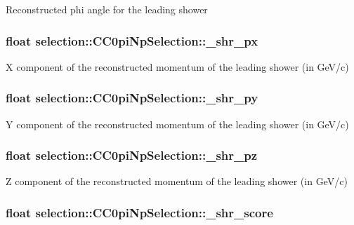 Reconstructed phi angle for the leading shower \hypertarget{classselection_1_1CC0piNpSelection_a52e2043c82f5de7f93ac9bad63563f18}{
\subsubsection[{\-\_\-shr\-\_\-px}]{\setlength{\rightskip}{0pt plus 5cm}float selection\-::\-C\-C0pi\-Np\-Selection\-::\-\_\-shr\-\_\-px\hspace{0.3cm}{\ttfamily [private]}}}\label{classselection_1_1CC0piNpSelection_a52e2043c82f5de7f93ac9bad63563f18}
X component of the reconstructed momentum of the leading shower (in Ge\-V/c) \hypertarget{classselection_1_1CC0piNpSelection_a436dd7081c84003dabb595289d745111}{
\subsubsection[{\-\_\-shr\-\_\-py}]{\setlength{\rightskip}{0pt plus 5cm}float selection\-::\-C\-C0pi\-Np\-Selection\-::\-\_\-shr\-\_\-py\hspace{0.3cm}{\ttfamily [private]}}}\label{classselection_1_1CC0piNpSelection_a436dd7081c84003dabb595289d745111}
Y component of the reconstructed momentum of the leading shower (in Ge\-V/c) \hypertarget{classselection_1_1CC0piNpSelection_a769319ad32b6ce49c7a5283b246303fa}{
\subsubsection[{\-\_\-shr\-\_\-pz}]{\setlength{\rightskip}{0pt plus 5cm}float selection\-::\-C\-C0pi\-Np\-Selection\-::\-\_\-shr\-\_\-pz\hspace{0.3cm}{\ttfamily [private]}}}\label{classselection_1_1CC0piNpSelection_a769319ad32b6ce49c7a5283b246303fa}
Z component of the reconstructed momentum of the leading shower (in Ge\-V/c) \hypertarget{classselection_1_1CC0piNpSelection_a9033ad097ef1b7a4e10b2b872b82f068}{
\subsubsection[{\-\_\-shr\-\_\-score}]{\setlength{\rightskip}{0pt plus 5cm}float selection\-::\-C\-C0pi\-Np\-Selection\-::\-\_\-shr\-\_\-score\hspace{0.3cm}{\ttfamily [private]}}}\label{classselection_1_1CC0piNpSelection_a9033ad097ef1b7a4e10b2b872b82f068}

